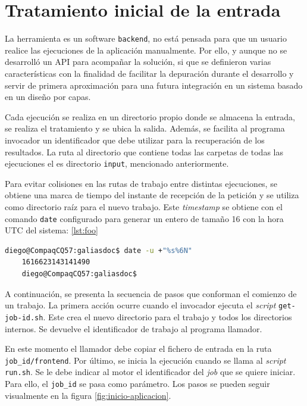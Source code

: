 \section{Tratamiento inicial de la entrada}

La herramienta es un software \verb|backend|, no está pensada para que un usuario realice las ejecuciones de la aplicación manualmente. Por ello, y aunque no se desarrolló un API para acompañar la solución, si que se definieron varias características con la finalidad de facilitar la depuración durante el desarrollo y servir de primera aproximación para una futura integración en un sistema basado en un diseño por capas.

Cada ejecución se realiza en un directorio propio donde se almacena la entrada, se realiza el tratamiento y se ubica la salida. Además, se facilita al programa invocador un identificador que debe utilizar para la recuperación de los resultados. La ruta al directorio que contiene todas las carpetas de todas las ejecuciones el es directorio \verb|input|, mencionado anteriormente.


Para evitar colisiones en las rutas de trabajo entre distintas ejecuciones, se obtiene una marca de tiempo del instante de recepción de la petición y se utiliza como directorio raíz para el nuevo trabajo. Este \emph{timestamp} se obtiene con el comando \verb|date| configurado para generar un entero de tamaño 16 con la hora UTC del sistema: \ref{lst:foo}

\begin{lstlisting}[language=bash,caption={Obtención del identificador del trabajo},label=lst:identificador-trabajo]
    diego@CompaqCQ57:galiasdoc$ date -u +"%s%6N"
    1616623143141490
    diego@CompaqCQ57:galiasdoc$
\end{lstlisting}

A continuación, se presenta la secuencia de pasos que conforman el comienzo de un trabajo. La primera acción ocurre cuando el invocador ejecuta el \emph{script} \verb|get-job-id.sh|. Este crea el nuevo directorio para el trabajo y todos los directorios internos. Se devuelve el identificador de trabajo al programa llamador.

En este momento el llamador debe copiar el fichero de entrada en la ruta \verb|job_id/frontend|. Por último, se inicia la ejecución cuando se llama al \emph{script} \verb|run.sh|. Se le debe indicar al motor el identificador del \emph{job} que se quiere iniciar. Para ello, el \verb|job_id| se pasa como parámetro. Los pasos se pueden seguir visualmente en la figura \ref{fig:inicio-aplicacion}.

